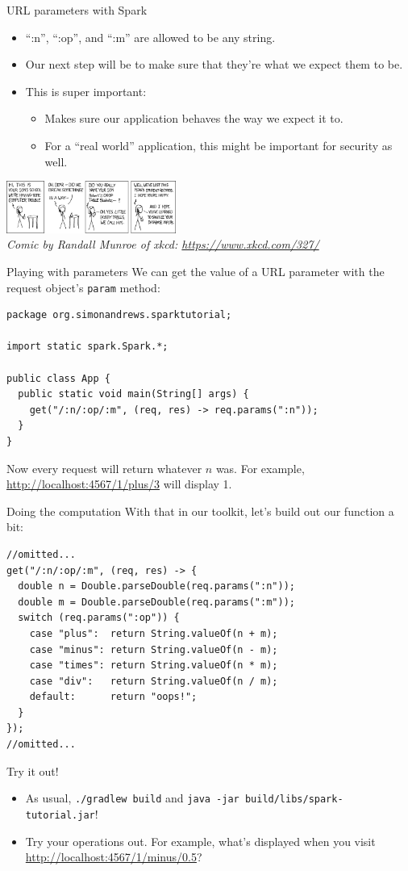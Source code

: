 \begin{frame}{URL parameters with Spark}
\begin{itemize}
    \item ``:n'', ``:op'', and ``:m'' are allowed to be any string.
    \item Our next step will be to make sure that they're what we expect them to be.
    \item This is super important:
    \begin{itemize}
        \item Makes sure our application behaves the way we expect it to.
        \item For a ``real world'' application, this might be important for security as well.
    \end{itemize}
\end{itemize}
\begin{center}
\includegraphics[width=15em]{resources/xkcd_327.png} \\
\textit{Comic by Randall Munroe of xkcd: \url{https://www.xkcd.com/327/}}
\end{center}
\end{frame}

\begin{frame}[fragile]{Playing with parameters}
We can get the value of a URL parameter with the request object's \texttt{param} method:
\begin{verbatim}
package org.simonandrews.sparktutorial;

import static spark.Spark.*;

public class App {
  public static void main(String[] args) {
    get("/:n/:op/:m", (req, res) -> req.params(":n"));
  }
}
\end{verbatim}
Now every request will return whatever $n$ was. For example, \url{http://localhost:4567/1/plus/3} will display 1.
\end{frame}

\begin{frame}[fragile]{Doing the computation}
With that in our toolkit, let's build out our function a bit:
\begin{verbatim}
//omitted...
get("/:n/:op/:m", (req, res) -> {
  double n = Double.parseDouble(req.params(":n"));
  double m = Double.parseDouble(req.params(":m"));
  switch (req.params(":op")) {
    case "plus":  return String.valueOf(n + m);
    case "minus": return String.valueOf(n - m);
    case "times": return String.valueOf(n * m);
    case "div":   return String.valueOf(n / m);
    default:      return "oops!";
  }
});
//omitted...
\end{verbatim}
    
\end{frame}

\begin{frame}{Try it out!}
\begin{itemize}
    \item As usual, \texttt{./gradlew build} and \texttt{java -jar build/libs/spark-tutorial.jar}!
    \item Try your operations out. For example, what's displayed when you visit \url{http://localhost:4567/1/minus/0.5}?
\end{itemize}
\end{frame}